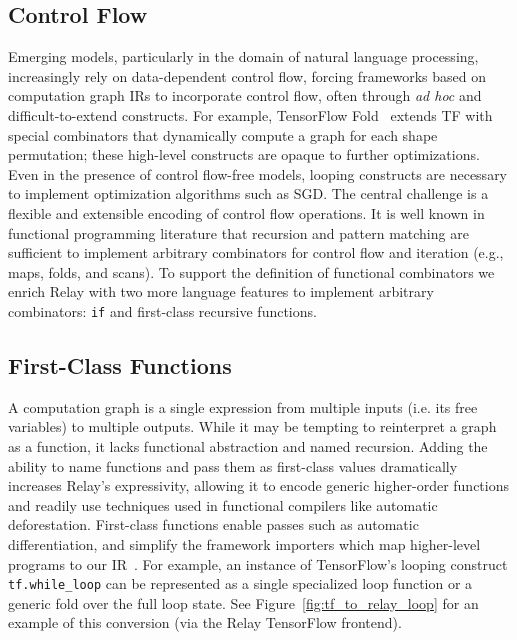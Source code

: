 \subsection{Control Flow}

Emerging models, particularly in the domain of natural language processing,
  increasingly rely on data-dependent control flow,
  forcing frameworks based on computation graph IRs
  to incorporate control flow, often through \textit{ad hoc} and difficult-to-extend constructs.
For example, TensorFlow Fold~\citep{tf_fold} extends TF with special combinators that
  dynamically compute a graph for each shape permutation;
  these high-level constructs are opaque to further optimizations.
Even in the presence of control flow-free models, looping
  constructs are necessary to implement optimization algorithms
  such as SGD.
The central challenge is a flexible and extensible encoding of
  control flow operations.
It is well known in functional programming literature that recursion and pattern matching are sufficient
  to implement arbitrary combinators for control flow and iteration (e.g., maps, folds, and scans).
To support the definition of functional combinators
  we enrich Relay with two more language
  features to implement arbitrary combinators: \verb|if| and first-class recursive functions.

\subsection{First-Class Functions}

A computation graph is a single expression
  from multiple inputs (i.e. its free variables) to multiple outputs.
While it may be tempting to reinterpret a graph as a function, it lacks functional abstraction
  and named recursion.
Adding the ability to name functions and pass them as first-class values dramatically increases
  Relay's expressivity, allowing it to encode generic
  higher-order functions and readily use techniques used in functional
  compilers like automatic deforestation.
First-class functions enable passes such as
  automatic differentiation, and simplify
  the framework importers which map higher-level programs to our IR~\citep{myia}.
For example, an instance of TensorFlow's looping construct \verb|tf.while_loop|
  can be represented as a single specialized loop function
  or a generic fold over the full loop state.
See Figure~\ref{fig:tf_to_relay_loop} for an example of this conversion (via
  the Relay TensorFlow frontend).

